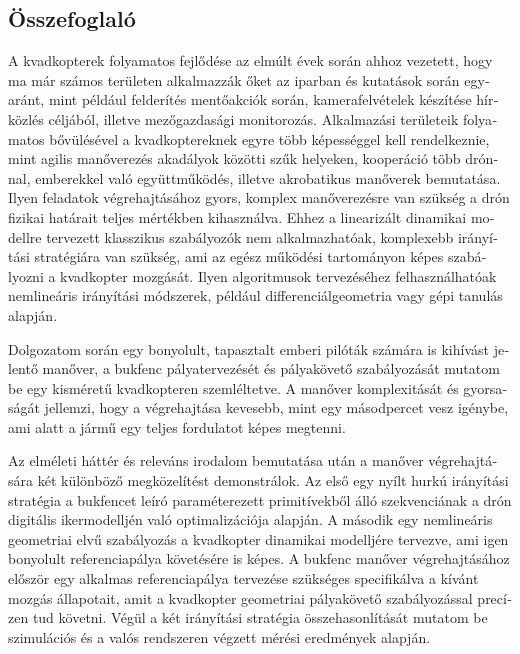 \begin{otherlanguage}{magyar}
\section*{Összefoglaló}
A kvadkopterek folyamatos fejlődése az elmúlt évek során ahhoz vezetett, hogy ma már számos területen alkalmazzák őket az iparban és kutatások során egyaránt, mint például felderítés mentőakciók során, kamerafelvételek készítése hírközlés céljából, illetve mezőgazdasági monitorozás. Alkalmazási területeik folyamatos bővülésével a kvadkoptereknek egyre több képességgel kell rendelkeznie, mint agilis manőverezés akadályok közötti szűk helyeken, kooperáció több drónnal, emberekkel való együttműködés, illetve akrobatikus manőverek bemutatása. Ilyen feladatok végrehajtásához gyors, komplex manőverezésre van szükség a drón fizikai határait teljes mértékben kihasználva. Ehhez a linearizált dinamikai modellre tervezett klasszikus szabályozók nem alkalmazhatóak, komplexebb irányítási stratégiára van szükség, ami az egész működési tartományon képes szabályozni a kvadkopter mozgását. Ilyen algoritmusok tervezéséhez felhasználhatóak nemlineáris irányítási módszerek, például differenciálgeometria vagy gépi tanulás alapján.


Dolgozatom során egy bonyolult, tapasztalt emberi pilóták számára is kihívást jelentő manőver, a bukfenc pályatervezését és pályakövető szabályozását mutatom be egy kisméretű kvadkopteren szemléltetve. A manőver komplexitását és gyorsaságát jellemzi, hogy a végrehajtása kevesebb, mint egy másodpercet vesz igénybe, ami alatt a jármű egy teljes fordulatot képes megtenni.

Az elméleti háttér és releváns irodalom bemutatása után a manőver végrehajtására két különböző megközelítést demonstrálok. Az első egy nyílt hurkú irányítási stratégia a bukfencet leíró paraméterezett primitívekből álló szekvenciának a drón digitális ikermodelljén való optimalizációja alapján. A második egy nemlineáris geometriai elvű szabályozás a kvadkopter dinamikai modelljére tervezve, ami igen bonyolult referenciapálya követésére is képes. A bukfenc manőver végrehajtásához először egy alkalmas referenciapálya tervezése szükséges specifikálva a kívánt mozgás állapotait, amit a kvadkopter geometriai pályakövető szabályozással precízen tud követni. Végül a két irányítási stratégia összehasonlítását mutatom be szimulációs és a valós rendszeren végzett mérési eredmények alapján.
\pagebreak
\end{otherlanguage}